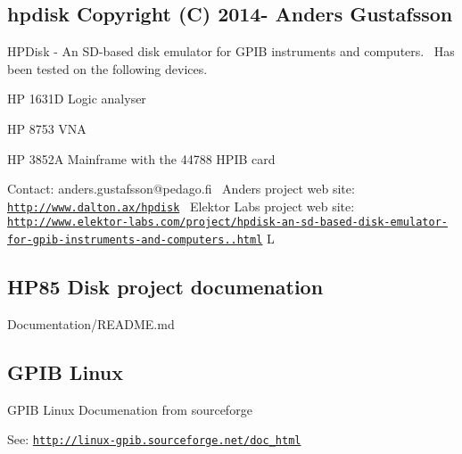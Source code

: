 \subsection*{hpdisk Copyright (C) 2014-\/ Anders Gustafsson}

H\+P\+Disk -\/ An S\+D-\/based disk emulator for G\+P\+IB instruments and computers.~\newline
 Has been tested on the following devices.
\begin{DoxyItemize}
\item HP 1631D Logic analyser
\item HP 8753 V\+NA
\item HP 3852A Mainframe with the 44788 H\+P\+IB card
\end{DoxyItemize}

Contact\+: anders.\+gustafsson@pedago.\+fi~\newline
 Anders project web site\+: \href{http://www.dalton.ax/hpdisk}{\tt http\+://www.\+dalton.\+ax/hpdisk}~\newline
 Elektor Labs project web site\+: \href{http://www.elektor-labs.com/project/hpdisk-an-sd-based-disk-emulator-for-gpib-instruments-and-computers.13693.html}{\tt http\+://www.\+elektor-\/labs.\+com/project/hpdisk-\/an-\/sd-\/based-\/disk-\/emulator-\/for-\/gpib-\/instruments-\/and-\/computers..\+html} L 



\subsection*{H\+P85 Disk project documenation}


\begin{DoxyItemize}
\item Documentation/\+R\+E\+A\+D\+M\+E.\+md
\end{DoxyItemize}





\subsection*{G\+P\+IB Linux}


\begin{DoxyItemize}
\item G\+P\+IB Linux Documenation from sourceforge
\begin{DoxyItemize}
\item See\+: \href{http://linux-gpib.sourceforge.net/doc_html}{\tt http\+://linux-\/gpib.\+sourceforge.\+net/doc\+\_\+html}
\end{DoxyItemize}
\end{DoxyItemize}





